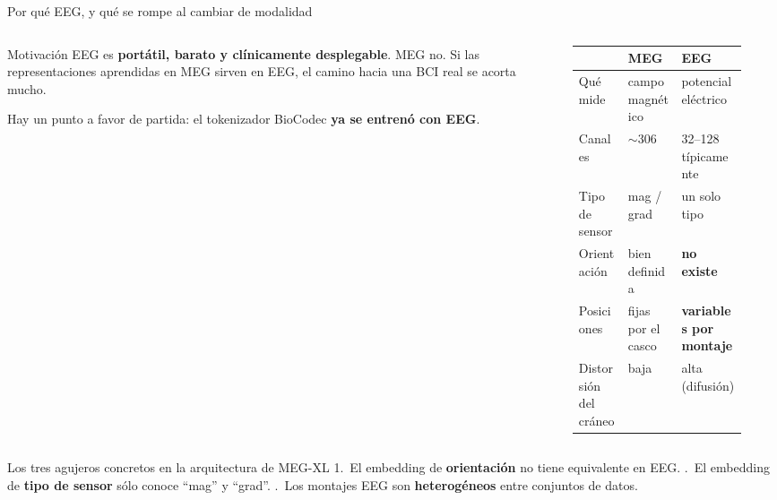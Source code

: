 \documentclass[aspectratio=169,10pt]{beamer}
\newcommand{\term}[1]{\textbf{\color{deepgreen}#1}}
\begin{document}
\begin{frame}[c]{Por qué EEG, y qué se rompe al cambiar de modalidad}
  \small
  \begin{columns}[c,totalwidth=\linewidth]
    \begin{column}{0.36\linewidth}
      \begin{block}{Motivación}
        \footnotesize
        EEG es \term{portátil, barato y clínicamente desplegable}. MEG no. Si las representaciones aprendidas en MEG sirven en EEG, el camino hacia una BCI real se acorta mucho.
      \end{block}
      \vspace{1mm}
      {\footnotesize Hay un punto a favor de partida: el tokenizador BioCodec \term{ya se entrenó con EEG}.}
    \end{column}
    \begin{column}{0.62\linewidth}
      \centering
      \scriptsize
      \setlength{\tabcolsep}{3pt}
      \renewcommand{\arraystretch}{1.15}
      \begin{tabular}{p{0.24\linewidth}p{0.26\linewidth}p{0.32\linewidth}}
        \toprule
        & \textbf{MEG} & \textbf{EEG} \\
        \midrule
        Qué mide & campo magnético & potencial eléctrico \\
        Canales & $\sim$306 & 32--128 típicamente \\
        Tipo de sensor & mag / grad & un solo tipo \\
        Orientación & bien definida & \term{no existe} \\
        Posiciones & fijas por el casco & \term{variables por montaje} \\
        Distorsión del cráneo & baja & alta (difusión) \\
        \bottomrule
      \end{tabular}
    \end{column}
  \end{columns}
  \vspace{2mm}
  \begin{alertblock}{Los tres agujeros concretos en la arquitectura de MEG-XL}
    \footnotesize
    1.~El embedding de \term{orientación} no tiene equivalente en EEG. .~El embedding de \term{tipo de sensor} sólo conoce ``mag'' y ``grad''. .~Los montajes EEG son \term{heterogéneos} entre conjuntos de datos.
  \end{alertblock}
\end{frame}
\end{document}

